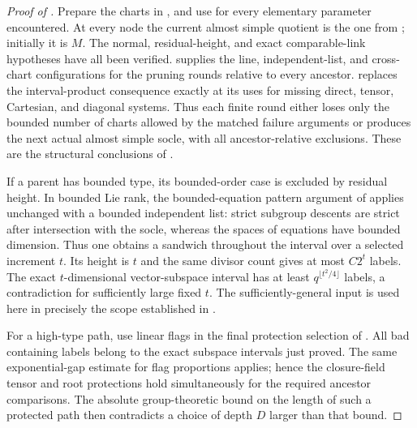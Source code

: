 \begin{proof}[Proof of ]
Prepare the charts in , and use
 for every elementary parameter encountered.
At every node the current almost simple quotient is the one from
; initially it is $M$.  The normal, residual-height,
and exact comparable-link hypotheses have all been verified.
 supplies the line, independent-list, and
cross-chart configurations for the pruning rounds relative to every
ancestor.   replaces the interval-product
consequence exactly at its uses for missing direct, tensor,
Cartesian, and diagonal systems.  Thus each finite round either
loses only the bounded number of charts allowed by the matched
failure arguments or produces the next actual almost simple socle,
with all ancestor-relative exclusions.  These are the structural
conclusions of .

If a parent has bounded type, its bounded-order case is excluded by
residual height.  In bounded Lie rank, the bounded-equation pattern
argument of  applies unchanged with a bounded
independent list: strict subgroup descents are strict after
intersection with the socle, whereas the spaces of equations have
bounded dimension.  Thus one obtains a sandwich throughout the
interval over a selected increment $t$.  Its height is $t$ and the
same divisor count gives at most $C2^t$ labels.  The exact
$t$-dimensional vector-subspace interval has at least
$q^{\lfloor t^2/4\rfloor}$ labels, a contradiction for sufficiently
large fixed $t$.  The sufficiently-general input is used here in
precisely the scope established in 
\citep{LarsenPink2011}.

For a high-type path, use linear flags in the final protection
selection of .  All bad containing labels belong
to the exact subspace intervals just proved.  The same
exponential-gap estimate for flag proportions applies; hence the
closure-field tensor and root protections hold simultaneously for
the required ancestor comparisons.  The absolute group-theoretic
bound  on the length of such a protected path
then contradicts a
choice of depth $D$ larger than that bound.


\end{proof}

